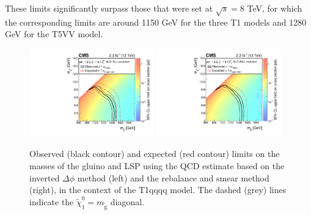 These limits significantly surpass those that were
set at $\sqrt{s}=8$ TeV,
for which the corresponding limits are around
1150 GeV \cite{Chatrchyan:2013wxa,Chatrchyan:2014lfa} for the
three T1 models and 1280 GeV \cite{Chatrchyan:2014lfa} for the T5VV model.
\begin{figure}[tb!]
\centering
    \includegraphics[width=0.48\textwidth]{figures/SusySearches/Ra2b2015/SMSqqqqXSEC.pdf}
    \includegraphics[width=0.48\textwidth]{figures/SusySearches/Ra2b2015/SMSqqqqXSEC_rps.pdf}
    \caption{Observed (black contour) and expected (red contour) limits on the masses of the gluino and LSP using the QCD estimate based on the inverted $\Delta\phi$ method (left) and the rebalance and smear method (right), in the context of the T1qqqq model. The dashed (grey) lines indicate the $\tilde{\chi}^{0}_{1}=m_{\tilde{\text{g}}}$ diagonal.}
    \label{fig:limitsT1qqqq}
\end{figure}
